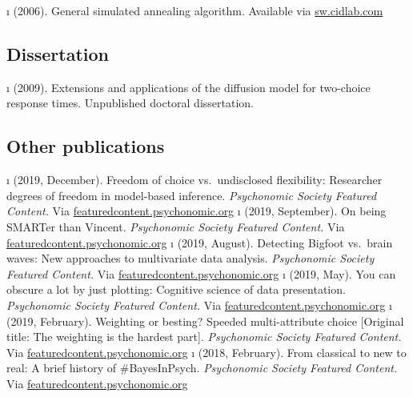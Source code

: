 \documentclass[]{article}
\begin{document}
\i \vdkh{} (2006).
\newblock General simulated annealing algorithm.
\newblock Available via \url{sw.cidlab.com}
\erefs


\subsection*{Dissertation}
\srefs
\i \vdkh{} (2009).
\newblock  Extensions and applications of the diffusion model for two-choice response times. Unpublished doctoral dissertation. 
\erefs

\subsection*{Other publications}
\srefs
\i \vdkh{} (2019, December).   \newblock Freedom of choice vs.\ undisclosed flexibility: Researcher degrees of freedom in model-based inference. {\em Psychonomic Society Featured Content.}
\newblock Via \hyperlink{featuredcontent.psychonomic.org}{featuredcontent.psychonomic.org}
\i \vdkh{} (2019, September).  \newblock On being SMARTer than Vincent. {\em Psychonomic Society Featured Content.}
\newblock Via \hyperlink{featuredcontent.psychonomic.org}{featuredcontent.psychonomic.org}
\i \vdkh{} (2019, August).     \newblock Detecting Bigfoot vs.\ brain waves: New approaches to multivariate data analysis. {\em Psychonomic Society Featured Content.}
\newblock Via \hyperlink{featuredcontent.psychonomic.org}{featuredcontent.psychonomic.org}
\i \vdkh{} (2019, May).        \newblock You can obscure a lot by just plotting: Cognitive science of data presentation. {\em Psychonomic Society Featured Content.}
\newblock Via \hyperlink{featuredcontent.psychonomic.org}{featuredcontent.psychonomic.org}
\i \vdkh{} (2019, February).   \newblock Weighting or besting? Speeded multi-attribute choice  [Original title: The weighting is the hardest part]. {\em Psychonomic Society Featured Content.}
\newblock Via \hyperlink{featuredcontent.psychonomic.org}{featuredcontent.psychonomic.org}
\i \vdkh{} (2018, February).   \newblock From classical to new to real: A brief history of \#BayesInPsych. {\em Psychonomic Society Featured Content.}
\newblock Via \hyperlink{featuredcontent.psychonomic.org}{featuredcontent.psychonomic.org}
\erefs
\end{document}
